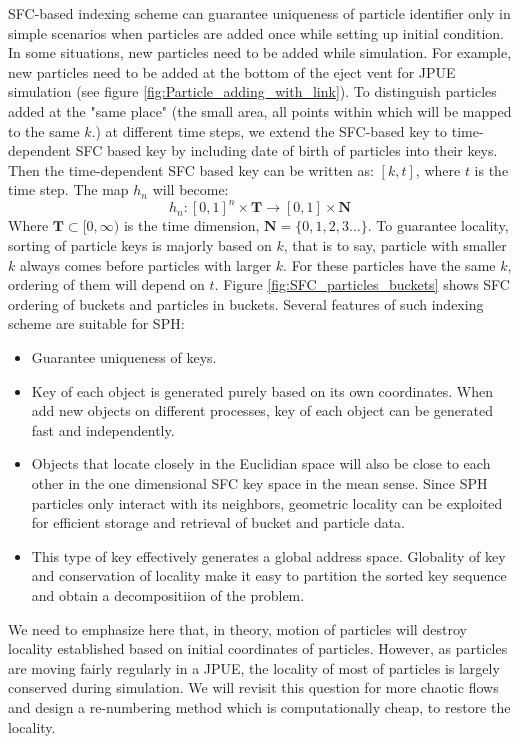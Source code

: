 \documentclass[conference,compsoc]{IEEEtran}
\begin{document}
SFC-based indexing scheme can guarantee uniqueness of particle identifier only in simple scenarios when particles are added once while setting up initial condition. In some situations, new particles need to be added while simulation. For example, new particles need to be added at the bottom of the eject vent for JPUE simulation (see figure \ref{fig:Particle_adding_with_link}). To distinguish particles added at the "same place" (the small area, all points within which will be mapped to the same $k$.) at different time steps, we extend the SFC-based key to time-dependent SFC based key by including date of birth of particles into their keys. Then the time-dependent SFC based key can be written as: $[k,t]$, where $t$ is the time step. The map $h_n$ will become:
\begin{equation}
h_n: [0,1]^n \times \textbf{T} \rightarrow [0,1] \times \textbf{N}
\end{equation}
Where $\textbf{T} \subset [0,\infty)$ is the time dimension, $\textbf{N}=\lbrace 0, 1, 2, 3...\rbrace$.
To guarantee locality, sorting of particle keys is majorly based on $k$, that is to say, particle with smaller $k$ always comes before particles with larger $k$. For these particles have the same $k$, ordering of them will depend on $t$. Figure \ref{fig:SFC_particles_buckets} shows SFC ordering of buckets and particles in buckets. 
Several features of such indexing scheme are suitable for SPH:
\begin{itemize}
\item Guarantee uniqueness of keys.
\item Key of each object is generated purely based on its own coordinates. When add new objects on different processes, key of each object can be generated fast and independently.
\item Objects that locate closely in the Euclidian space will also be close to each other in the one dimensional SFC key space in the mean sense. Since SPH particles only interact with its neighbors, geometric locality can be exploited for efficient storage and retrieval of bucket and particle data.
\item This type of key effectively generates a global address space. Globality of key and conservation of locality make it easy to partition the sorted key sequence and obtain a decompositiion of the problem.
\end{itemize}
We need to emphasize here that, in theory, motion of particles will destroy locality established based on initial coordinates of particles. However, as particles are moving fairly regularly in a JPUE, the locality of most of particles is largely conserved during simulation. We will revisit this question for more chaotic flows and 
design a re-numbering method which is computationally cheap, to restore the locality.
\end{document}
